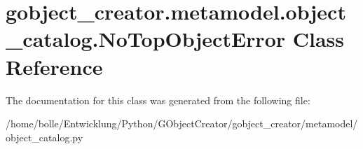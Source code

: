 \hypertarget{classgobject__creator_1_1metamodel_1_1object__catalog_1_1NoTopObjectError}{
\section{gobject\_\-creator.metamodel.object\_\-catalog.NoTopObjectError Class Reference}
\label{classgobject__creator_1_1metamodel_1_1object__catalog_1_1NoTopObjectError}
}


The documentation for this class was generated from the following file:\begin{DoxyCompactItemize}
\item 
/home/bolle/Entwicklung/Python/GObjectCreator/gobject\_\-creator/metamodel/object\_\-catalog.py\end{DoxyCompactItemize}
